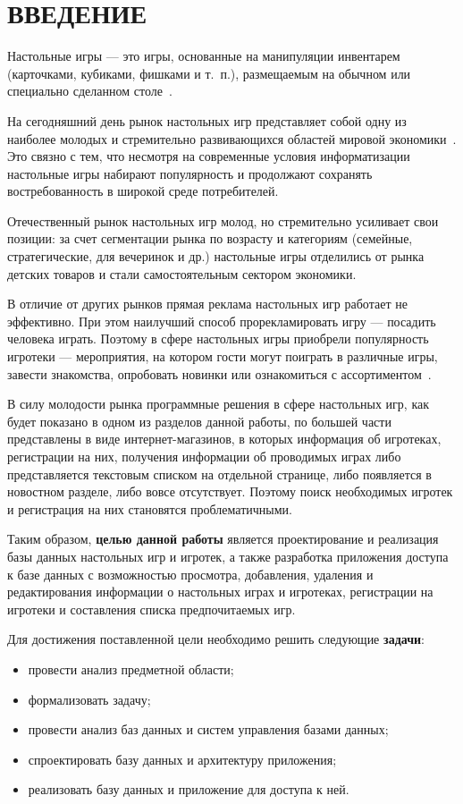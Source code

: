 \chapter*{ВВЕДЕНИЕ}

Настольные игры --- это игры, основанные на манипуляции инвентарем (карточками,
кубиками, фишками и т.~п.), размещаемым на обычном или специально сделанном
столе~\cite{art01}.

На сегодняшний день рынок настольных игр представляет собой одну из наиболее
молодых и стремительно развивающихся областей мировой
экономики~\cite{art02}. Это связно с тем, что несмотря на современные условия
информатизации настольные игры набирают популярность и продолжают сохранять
востребованность в широкой среде потребителей.

Отечественный рынок настольных игр молод, но стремительно усиливает свои
позиции: за счет сегментации рынка по возрасту и категориям (семейные,
стратегические, для вечеринок и др.) настольные игры отделились от рынка
детских товаров и стали самостоятельным сектором экономики.

В отличие от других рынков прямая реклама настольных игр работает не эффективно.
При этом наилучший способ прорекламировать игру --- посадить человека играть.
Поэтому в сфере настольных игры приобрели популярность игротеки --- мероприятия,
на котором гости могут поиграть в различные игры, завести знакомства, опробовать
новинки или ознакомиться с ассортиментом~\cite{art03}.

В силу молодости рынка программные решения в сфере настольных игр, как будет
показано в одном из разделов данной работы, по большей части представлены в виде
интернет-магазинов, в которых информация об игротеках, регистрации на них,
получения информации об проводимых играх либо представляется текстовым списком
на отдельной странице, либо появляется в новостном разделе, либо вовсе
отсутствует.  Поэтому поиск необходимых игротек и регистрация на них становятся
проблематичными.

Таким образом, \textbf{целью данной работы} является проектирование и реализация
базы данных настольных игр и игротек, а также разработка приложения доступа к
базе данных с возможностью просмотра, добавления, удаления и редактирования
информации о настольных играх и игротеках, регистрации на игротеки и составления
списка предпочитаемых игр.

Для достижения поставленной цели необходимо решить следующие \textbf{задачи}:
\begin{itemize}
    \item провести анализ предметной области;
    \item формализовать задачу;
    \item провести анализ баз данных и систем управления базами данных;
    \item спроектировать базу данных и архитектуру приложения;
    \item реализовать базу данных и приложение для доступа к ней.
\end{itemize}

